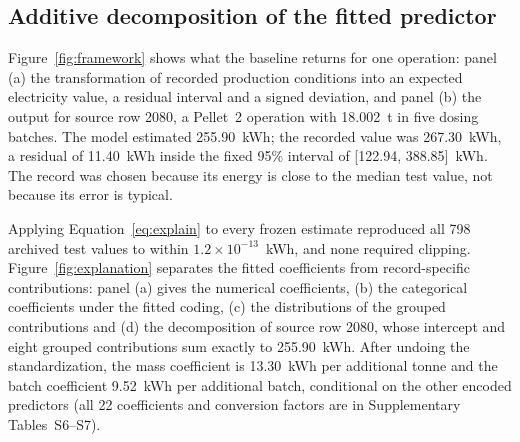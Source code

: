 \FloatBarrier
\subsection{Additive decomposition of the fitted predictor}
Figure~\ref{fig:framework} shows what the baseline returns for one operation: panel (a) the transformation of recorded production conditions into an expected electricity value, a residual interval and a signed deviation, and panel (b) the output for source row 2080, a Pellet~2 operation with 18.002~t in five dosing batches. The model estimated 255.90~kWh; the recorded value was 267.30~kWh, a residual of 11.40~kWh inside the fixed 95\% interval of [122.94, 388.85]~kWh. The record was chosen because its energy is close to the median test value, not because its error is typical.


Applying Equation~\ref{eq:explain} to every frozen estimate reproduced all 798 archived test values to within $1.2\times10^{-13}$~kWh, and none required clipping. Figure~\ref{fig:explanation} separates the fitted coefficients from record-specific contributions: panel (a) gives the numerical coefficients, (b) the categorical coefficients under the fitted coding, (c) the distributions of the grouped contributions and (d) the decomposition of source row 2080, whose intercept and eight grouped contributions sum exactly to 255.90~kWh. After undoing the standardization, the mass coefficient is 13.30~kWh per additional tonne and the batch coefficient 9.52~kWh per additional batch, conditional on the other encoded predictors (all 22 coefficients and conversion factors are in Supplementary Tables~S6--S7).


